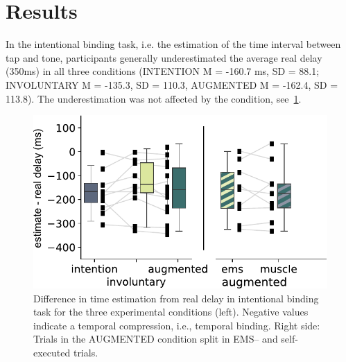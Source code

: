 \section{Results}

In the intentional binding task, i.e. the estimation of the time interval between tap and tone, participants generally underestimated the average real delay (350ms) in all three conditions (INTENTION M = -160.7 ms, SD = 88.1; INVOLUNTARY M = -135.3, SD = 110.3, AUGMENTED M = -162.4, SD = 113.8). The underestimation was not affected by the condition, see~\ref{fig:ib_task}.


\begin{figure}[h]
    \centering
    \includegraphics[width=\columnwidth]{figures/ib_task.pdf}
    \caption{Difference in time estimation from real delay in intentional binding task for the three experimental conditions (left). Negative values indicate a temporal compression, i.e., temporal binding. Right side: Trials in the AUGMENTED condition split in EMS-- and self-executed trials.}
    \label{fig:ib_task}
\end{figure}

